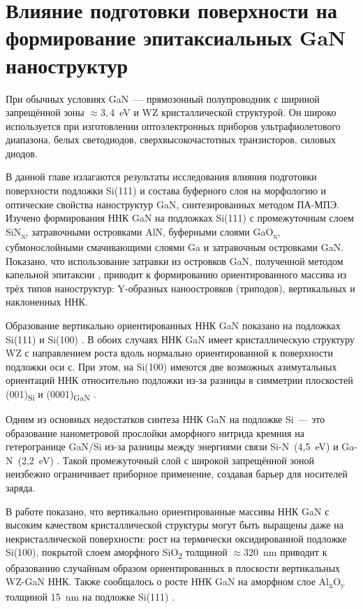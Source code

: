 \chapter{Влияние подготовки поверхности на формирование эпитаксиальных GaN наноструктур}\label{ch:ch3}

При обычных условиях GaN~--- прямозонный полупроводник с шириной запрещённой
зоны \(\approx 3,4\)~\si{\electronvolt} и WZ кристаллической структурой. Он
широко используется при изготовлении оптоэлектронных приборов ультрафиолетового
диапазона, белых светодиодов, сверхвысокочастотных транзисторов, силовых
диодов.

В данной главе излагаются результаты исследования влияния подготовки
поверхности подложки Si(111) и состава буферного слоя на морфологию и
оптические свойства наноструктур GaN, синтезированных методом ПА-МПЭ. Изучено
формирования ННК GaN на подложках Si(111) с промежуточным слоем
SiN\textsubscript{x}, затравочными островками AlN, буферными слоями
GaO\textsubscript{x}, субмонослойными смачивающими слоями Ga и затравочным
островками GaN. Показано, что использование затравки из островков GaN,
полученной методом капельной эпитаксии \cite{Debnath2009, Yu2014}, приводит к
формированию ориентированного массива из трёх типов наноструктур: Y-образных
наноостровков (триподов), вертикальных и наклоненных ННК.

Образование вертикально ориентированных ННК GaN показано на подложках Si(111) и
Si(100) \cite{Corfdir2009}. В обоих случаях ННК GaN имеет кристаллическую
структуру WZ с направлением роста вдоль нормально ориентированной к поверхности
подложки оси с. При этом, на Si(100) имеются две возможных азимутальных
ориентаций ННК относительно подложки из-за разницы в симметрии плоскостей
(001)\textsubscript{Si} и (0001)\textsubscript{GaN} \cite{Largeau2008}.

Одним из основных недостатков синтеза ННК GaN на подложке Si~--- это
образование нанометровой прослойки аморфного нитрида кремния на гетерогранице
GaN/Si из-за разницы между энергиями связи Si-N~(4,5~\si{\electronvolt}) и
Ga-N~(2,2~\si{\electronvolt}) \cite{Stoica2008}. Такой промежуточный слой с
широкой запрещённой зоной неизбежно ограничивает приборное применение, создавая
барьер для носителей заряда.

В работе \cite{Stoica2008} показано, что вертикально ориентированные массивы
ННК GaN с высоким качеством кристаллической структуры могут быть выращены даже
на некристаллической поверхности: рост на термически оксидированной подложке
Si(100), покрытой слоем аморфного SiO\textsubscript{2} толщиной \(\approx
320\)~\si{\nano\meter} приводит к образованию случайным образом ориентированных
в плоскости вертикальных WZ-GaN ННК. Также сообщалось о росте ННК GaN на
аморфном слое Al\textsubscript{x}O\textsubscript{y} толщиной
15~\si{\nano\meter} на подложке Si(111) \cite{Sobanska2016}.

